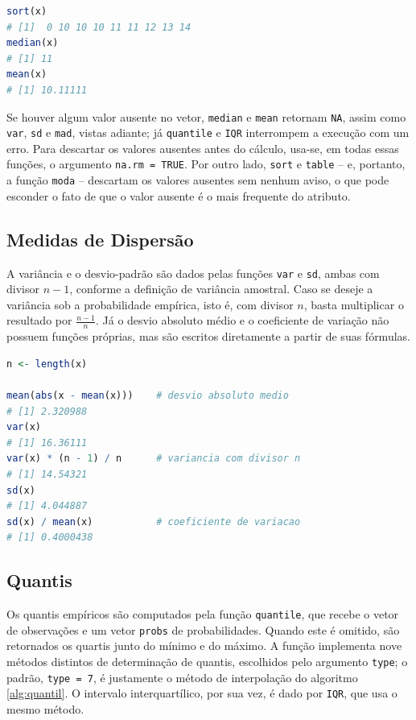 \begin{lstlisting}[language=R, caption={Estatísticas de Ordem, Mediana e Média}, label={cod:posicao}]
sort(x)
# [1]  0 10 10 10 11 11 12 13 14
median(x)
# [1] 11
mean(x)
# [1] 10.11111
\end{lstlisting}

Se houver algum valor ausente no vetor, \texttt{median} e \texttt{mean} retornam
\texttt{NA}, assim como \texttt{var}, \texttt{sd} e \texttt{mad}, vistas adiante; já
\texttt{quantile} e \texttt{IQR} interrompem a execução com um erro.
Para descartar os valores ausentes antes do cálculo, usa-se, em todas essas funções, o
argumento \texttt{na.rm = TRUE}.
Por outro lado, \texttt{sort} e \texttt{table} -- e, portanto, a função \texttt{moda} --
descartam os valores ausentes sem nenhum aviso, o que pode esconder o fato de que o valor
ausente é o mais frequente do atributo.

\subsection{Medidas de Dispersão}

A variância e o desvio-padrão são dados pelas funções \texttt{var} e \texttt{sd}, ambas
com divisor $n - 1$, conforme a definição de variância amostral.
Caso se deseje a variância sob a probabilidade empírica, isto é, com divisor $n$, basta
multiplicar o resultado por $\frac{n-1}{n}$.
Já o desvio absoluto médio e o coeficiente de variação não possuem funções próprias, mas
são escritos diretamente a partir de suas fórmulas.

\begin{lstlisting}[language=R, caption={Medidas de Dispersão}, label={cod:dispersao}]
n <- length(x)

mean(abs(x - mean(x)))    # desvio absoluto medio
# [1] 2.320988
var(x)
# [1] 16.36111
var(x) * (n - 1) / n      # variancia com divisor n
# [1] 14.54321
sd(x)
# [1] 4.044887
sd(x) / mean(x)           # coeficiente de variacao
# [1] 0.4000438
\end{lstlisting}

\subsection{Quantis}

Os quantis empíricos são computados pela função \texttt{quantile}, que recebe o vetor de
observações e um vetor \texttt{probs} de probabilidades.
Quando este é omitido, são retornados os quartis junto do mínimo e do máximo.
A função implementa nove métodos distintos de determinação de quantis, escolhidos pelo
argumento \texttt{type}; o padrão, \texttt{type = 7}, é justamente o método de
interpolação do algoritmo \ref{alg:quantil}.
O intervalo interquartílico, por sua vez, é dado por \texttt{IQR}, que usa o mesmo método.

